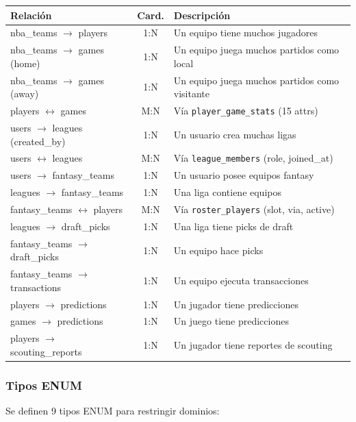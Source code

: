 \documentclass[12pt,a4paper]{article}
\begin{document}
\begin{longtable}{p{6cm} c p{6cm}}
\toprule
\textbf{Relaci\'on} & \textbf{Card.} & \textbf{Descripci\'on} \\
\midrule
\endhead
nba\_teams $\to$ players & 1:N & Un equipo tiene muchos jugadores \\
nba\_teams $\to$ games (home) & 1:N & Un equipo juega muchos partidos como local \\
nba\_teams $\to$ games (away) & 1:N & Un equipo juega muchos partidos como visitante \\
players $\leftrightarrow$ games & M:N & V\'ia \texttt{player\_game\_stats} (15 attrs) \\
users $\to$ leagues (created\_by) & 1:N & Un usuario crea muchas ligas \\
users $\leftrightarrow$ leagues & M:N & V\'ia \texttt{league\_members} (role, joined\_at) \\
users $\to$ fantasy\_teams & 1:N & Un usuario posee equipos fantasy \\
leagues $\to$ fantasy\_teams & 1:N & Una liga contiene equipos \\
fantasy\_teams $\leftrightarrow$ players & M:N & V\'ia \texttt{roster\_players} (slot, via, active) \\
leagues $\to$ draft\_picks & 1:N & Una liga tiene picks de draft \\
fantasy\_teams $\to$ draft\_picks & 1:N & Un equipo hace picks \\
fantasy\_teams $\to$ transactions & 1:N & Un equipo ejecuta transacciones \\
players $\to$ predictions & 1:N & Un jugador tiene predicciones \\
games $\to$ predictions & 1:N & Un juego tiene predicciones \\
players $\to$ scouting\_reports & 1:N & Un jugador tiene reportes de scouting \\
\bottomrule
\end{longtable}

\subsubsection{Tipos ENUM}

Se definen 9 tipos ENUM para restringir dominios:
\end{document}

